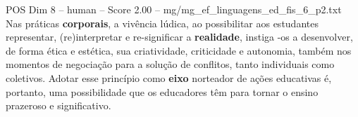 \begin{textsample}{POS Dim 8 – human – Score 2.00 – mg/mg\_ef\_linguagens\_ed\_fis\_6\_p2.txt}  \label{ex:f8_pos_020}
Nas práticas \textbf{corporais}, a vivência lúdica, ao possibilitar aos estudantes representar, (re)interpretar e re-significar a \textbf{realidade}, instiga -os a desenvolver, de forma ética e estética, sua criatividade, criticidade e autonomia, também nos momentos de negociação para a solução de conflitos, tanto individuais como coletivos.
Adotar esse princípio como \textbf{eixo} norteador de ações educativas é, portanto, uma possibilidade que os educadores têm para tornar o ensino prazeroso e significativo.

\end{textsample}
